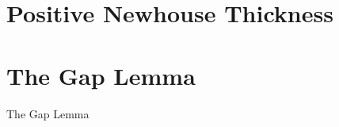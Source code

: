 \section{Positive Newhouse Thickness}
\section{The Gap Lemma}
\begin{lemma}{The Gap Lemma}
    
\end{lemma}